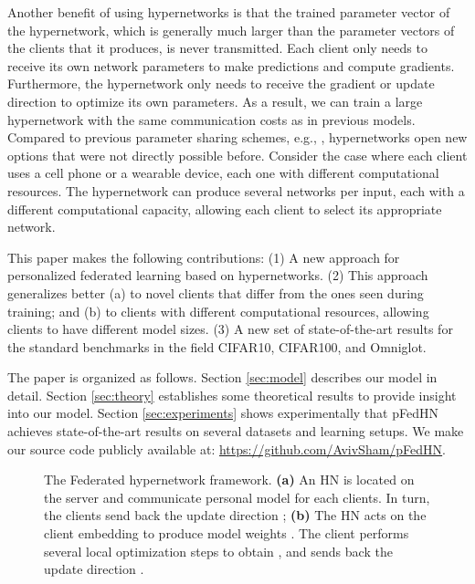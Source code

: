 \documentclass{article}
\newcommand\ourmethod{pFedHN}
\begin{document}
Another benefit of using hypernetworks is that the trained parameter vector of the hypernetwork, which is generally much larger than the parameter vectors of the clients that it produces, is never transmitted. Each client only needs to receive its own network parameters to make predictions and compute gradients. Furthermore, the hypernetwork only needs to receive the gradient or update direction to optimize its own parameters.  As a result, we can train a large hypernetwork with the same communication costs as in previous models. Compared to previous parameter sharing schemes, e.g., \citet{Dinh2020PersonalizedFL, McMahan2017CommunicationEfficientLO}, hypernetworks open new options that were not directly possible before. Consider the case where each client uses a cell phone or a wearable device, each one with different computational resources. 
The hypernetwork can produce several networks per input, each with a different computational capacity, allowing each client to select its appropriate network.

This paper makes the following contributions: (1) A new approach for personalized federated learning based on hypernetworks. 
(2) This approach generalizes better (a) to novel clients that differ from the ones seen during training; and (b) to clients with different computational resources, allowing clients to have different model sizes.   
(3) A new set of state-of-the-art results for the standard benchmarks in the field CIFAR10, CIFAR100, and Omniglot.


The paper is organized as follows. Section \ref{sec:model} describes our model in detail. Section \ref{sec:theory} establishes some theoretical results to provide insight into our model. Section \ref{sec:experiments} shows experimentally that \ourmethod{} achieves state-of-the-art results on several datasets and learning setups. We make our source code publicly available at: \textcolor{magenta}{\url{https://github.com/AvivSham/pFedHN}}. 



\begin{figure*}[t]
\centering
    \begin{subfigure}[]{
    \texttt{[image: figures/arch.png]}
    }
    \label{fig:global_arch}
    \end{subfigure}
    \hfill
    \begin{subfigure}[]{
    \texttt{[image: figures/arch\_local.png]}
    }
    \label{fig:arch_local}
     \end{subfigure}
    \caption{The Federated hypernetwork framework. \textbf{(a)} An HN is located on the server and communicate personal model for each clients. In turn, the clients send back the update direction ;
    \textbf{(b)} The HN acts on the client embedding  to produce model weights . The client performs several local optimization steps to obtain , and sends back the update direction .}
    \label{fig:arch}
\end{figure*}
 
\end{document}
